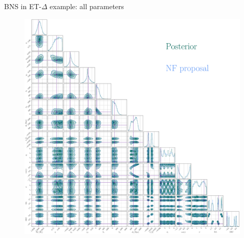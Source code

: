 \documentclass[usenames,dvipsnames,t]{beamer}
\begin{document}
\begin{frame}{BNS in ET-$\Delta$ example: all parameters}
  \begin{figure}
    \centering
    \includegraphics[scale=0.1075]{Figures/corner_plot_big.pdf}
  \end{figure}
\end{frame}



\end{document}
